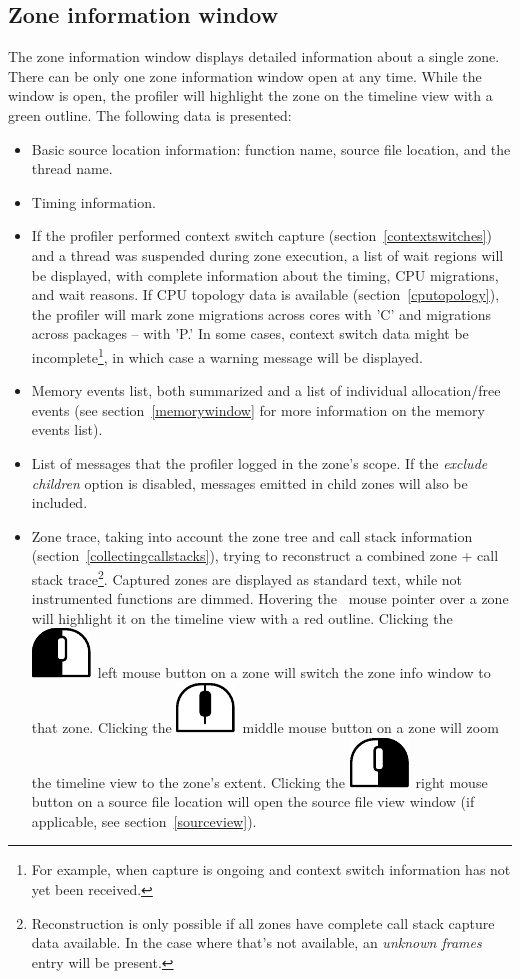 \documentclass[hidelinks,titlepage,a4paper]{article}
\newcommand{\LMB}{\includegraphics[height=.8\baselineskip]{icons/lmb}}
\newcommand{\RMB}{\includegraphics[height=.8\baselineskip]{icons/rmb}}
\newcommand{\MMB}{\includegraphics[height=.8\baselineskip]{icons/mmb}}
\begin{document}
\subsection{Zone information window}
\label{zoneinfo}

The zone information window displays detailed information about a single zone. There can be only one zone information window open at any time. While the window is open, the profiler will highlight the zone on the timeline view with a green outline. The following data is presented:

\begin{itemize}
\item Basic source location information: function name, source file location, and the thread name.
\item Timing information.
\item If the profiler performed context switch capture (section~\ref{contextswitches}) and a thread was suspended during zone execution, a list of wait regions will be displayed, with complete information about the timing, CPU migrations, and wait reasons. If CPU topology data is available (section~\ref{cputopology}), the profiler will mark zone migrations across cores with 'C' and migrations across packages -- with 'P.' In some cases, context switch data might be incomplete\footnote{For example, when capture is ongoing and context switch information has not yet been received.}, in which case a warning message will be displayed.
\item Memory events list, both summarized and a list of individual allocation/free events (see section~\ref{memorywindow} for more information on the memory events list).
\item List of messages that the profiler logged in the zone's scope. If the \emph{exclude children} option is disabled, messages emitted in child zones will also be included.
\item Zone trace, taking into account the zone tree and call stack information (section~\ref{collectingcallstacks}), trying to reconstruct a combined zone + call stack trace\footnote{Reconstruction is only possible if all zones have complete call stack capture data available. In the case where that's not available, an \emph{unknown frames} entry will be present.}. Captured zones are displayed as standard text, while not instrumented functions are dimmed. Hovering the \faMousePointer{}~mouse pointer over a zone will highlight it on the timeline view with a red outline. Clicking the \LMB{}~left mouse button on a zone will switch the zone info window to that zone. Clicking the \MMB{}~middle mouse button on a zone will zoom the timeline view to the zone's extent. Clicking the \RMB{}~right mouse button on a source file location will open the source file view window (if applicable, see section~\ref{sourceview}).

\end{itemize}
\end{document}
